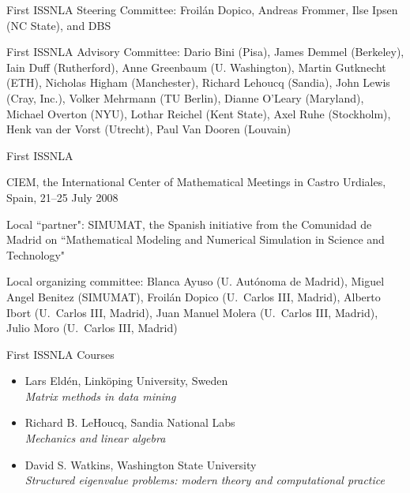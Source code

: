 \documentclass[]{seminar}
\begin{document}
{\begin{slide}
{\color{blue} First ISSNLA Steering Committee}:
Froil\'an Dopico, Andreas Frommer,
Ilse Ipsen (NC State), and DBS

{\color{blue} First ISSNLA Advisory Committee}:
Dario Bini (Pisa),
James Demmel (Berkeley), 
Iain Duff (Rutherford),
Anne Greenbaum (U. Washington),
Martin Gutknecht (ETH), 
Nicholas Higham (Manchester),
Richard Lehoucq (Sandia),
John Lewis (Cray, Inc.),
Volker Mehrmann (TU Berlin),
Dianne O'Leary (Maryland), 
Michael Overton (NYU),
Lothar Reichel (Kent State),
Axel Ruhe (Stockholm), %
Henk van der Vorst (Utrecht),
Paul Van Dooren (Louvain)


\end{slide}
\begin{slide}

\begin{center}
{\color{red}
First ISSNLA
}
\end{center}

CIEM, the International Center of
Mathematical Meetings in Castro Urdiales, Spain,
21--25 July 2008  

Local ``partner":
SIMUMAT, the Spanish initiative from the Comunidad de Madrid on
``Mathematical Modeling and Numerical Simulation in Science and
Technology"

{\color{blue} Local organizing committee:}
Blanca Ayuso (U. Aut{\'o}noma de Madrid),
Miguel Angel Benitez (SIMUMAT),
Froil{\'a}n Dopico  (U.\ Carlos III,  Madrid),
Alberto Ibort (U.\ Carlos III, Madrid),
Juan Manuel Molera (U.\ Carlos III, Madrid),
Julio Moro (U.\ Carlos III, Madrid)


\end{slide}
\begin{slide}

\begin{center}
{\color{blue}
First ISSNLA Courses
}
\end{center}

\begin{itemize} 
\item Lars Eld{\'e}n, Link{\"o}ping University, Sweden\\
\textit{Matrix methods in data mining}

\item Richard B. LeHoucq, Sandia National Labs\\
\textit{Mechanics and linear algebra}

\item David S. Watkins, Washington State University\\
\textit{Structured eigenvalue problems: modern theory and
computational practice}


\end{itemize}
\end{slide}}
\end{document}
